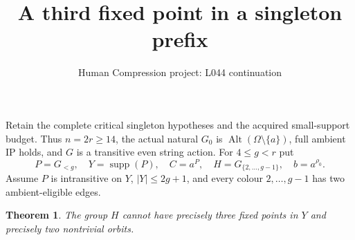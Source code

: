 \documentclass[11pt,a4paper]{article}
\title{A third fixed point in a singleton prefix}
\author{Human Compression project: L044 continuation}
\date{}
\newtheorem{theorem}{Theorem}
\begin{document}
\maketitle
Retain the complete critical singleton hypotheses and the acquired
small-support budget. Thus $n=2r\ge14$, the actual natural
$G_0$ is $\operatorname{Alt}(\Omega\setminus\{a\})$, full ambient IP
holds, and $G$ is a transitive even string action. For $4\le g<r$ put
\[
 P=G_{<g},\quad Y=\operatorname{supp}(P),\quad C=a^P,
 \quad H=G_{\{2,\ldots,g-1\}},\quad b=a^{\rho_0}.
\]
Assume $P$ is intransitive on $Y$, $|Y|\le2g+1$, and every
colour $2,\ldots,g-1$ has two ambient-eligible edges.
\begin{theorem}
The group $H$ cannot have precisely three fixed points in $Y$
and precisely two nontrivial orbits.
\end{theorem}
\end{document}
